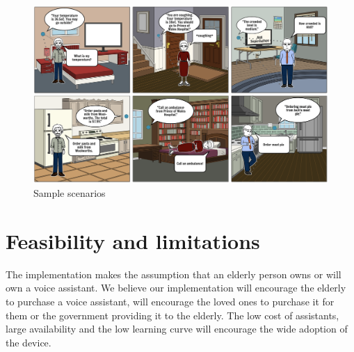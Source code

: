 \documentclass{article}
\begin{document}
\begin{figure}
        \centering
        \includegraphics[scale=0.43]{scenario.png}
        \caption{Sample scenarios}
        \label{fig:GD}
\end{figure}

\newpage

\section*{Feasibility and limitations}

The implementation makes the assumption that an elderly person owns or will own a voice assistant. We believe our implementation will encourage the elderly to purchase a voice assistant, will encourage the loved ones to purchase it for them or the government providing it to the elderly. The low cost of assistants, large availability and the low learning curve will encourage the wide adoption of the device.
\end{document}
